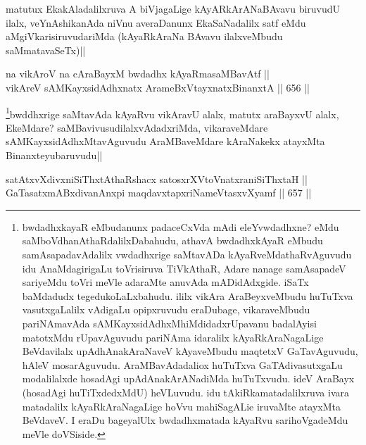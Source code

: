 \begin{artha}
matutux EkakAladalilxruva A biVjagaLige kAyARkArANaBAvavu biruvudU ilalx, veYnAshikanAda niVnu averaDanunx EkaSaNadalilx satf eMdu aMgiVkarisiruvudariMda (kAyaRkAraNa BAvavu ilalxveMbudu saMmatavaSeTx)||
\end{artha}


\begin{shl}
na vikAroV na cA\s \s raBayxM bwdadhx kAyaRmasaMBavAtf ||  \\
vikAreV sAMKayxsidAdhxnatx ArameBxV\s tayxnatxBinanxtA ||  656 ||  
\end{shl}

\begin{artha}
\footnote{bwdadhxkayaR eMbudanunx padaceCxVda mAdi eleYvwdadhxne? eMdu saMboVdhanAthaRdalilxDabahudu, athavA bwdadhxkAyaR eMbudu samAsapadavAdalilx vwdadhxrige saMtavADa kAyaRveMdathaRvAguvudu idu AnaMdagirigaLu toVrisiruva TiVkAthaR, Adare nanage samAsapadeV sariyeMdu toVri meVle adaraMte anuvAda mADidAdxgide. iSaTx baMdadudx tegedukoLaLxbahudu. ililx vikAra AraBeyxveMbudu huTuTxva vasutxgaLalilx vAdigaLu opipxruvudu eraDubage, vikaraveMbudu pariNAmavAda sAMKayxsidAdhxMhiMdidadxrUpavanu badalAyisi matotxMdu rUpavAguvudu pariNAma idaralilx kAyaRkAraNagaLige BeVdavilalx upAdhAnakAraNaveV kAyaveMbudu maqtetxV GaTavAguvudu, hAleV mosarAguvudu. AraMBavAdadaliox huTuTxva GaTAdivasutxgaLu modalilalxde hosadAgi upAdAnakArANadiMda huTuTxvudu. ideV AraBayx (hosadAgi huTiTxdedxMdU) heVLuvudu. idu tAkiRkamatadalilxruva ivara matadalilx kAyaRkAraNagaLige hoVvu mahiSagALie iruvaMte atayxMta BeVdaveV. I eraDu bageyalUlx bwdadhxmatada kAyaRvu sarihoVgadeMdu meVle doVSiside.}\footnotemark bwddhxrige saMtavAda kAyaRvu vikAravU alalx, matutx araBayxvU alalx, EkeMdare? saMBavivusudilalxvAdadxriMda, vikaraveMdare sAMKayxsidAdhxMtavAguvudu AraMBaveMdare kAraNakekx atayxMta Binanxteyubaruvudu||
\end{artha}


\begin{shl}
satAtxvXdivxniSiThxtAthaRshacx satosxrXVtoVnatxraniSiThxtaH || \\
GaTasatxmABxdivanAnxpi maqdavxtapxriNameVtasxvXyamf ||  657 ||  
\end{shl}


